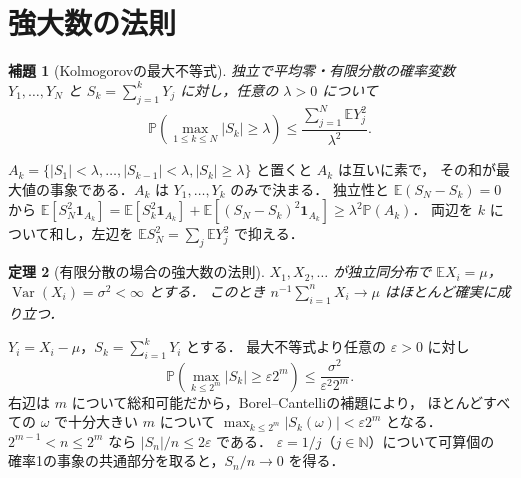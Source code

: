 \documentclass[a5paper,10pt,onecolumn]{jsarticle}
\makeatletter
\theoremstyle{mathnotetheorem}
\newtheorem{theorem}{定理}[section]
\newtheorem{lemma}[theorem]{補題}
\renewcommand{\proofname}{証明}
\renewenvironment{proof}[1][\proofname]{%
  \par\pushQED{\qed}\normalfont\topsep4\p@\@plus2\p@\relax
  \trivlist\item[\hskip\labelsep\bfseries #1]\ignorespaces
}{\popQED\endtrivlist\@endpefalse}
\makeatother
\begin{document}
\section{強大数の法則}
\begin{lemma}[Kolmogorovの最大不等式]
独立で平均零・有限分散の確率変数 $Y_1,\ldots,Y_N$ と
$S_k=\sum_{j=1}^kY_j$ に対し，任意の $\lambda>0$ について
\[
 \mathbb P\left(\max_{1\le k\le N}|S_k|\ge\lambda\right)
 \le\frac{\sum_{j=1}^N\mathbb E Y_j^2}{\lambda^2}.
\]
\end{lemma}
\begin{proof}
$A_k=\{|S_1|<\lambda,\ldots,|S_{k-1}|<\lambda,
|S_k|\ge\lambda\}$ と置くと $A_k$ は互いに素で，
その和が最大値の事象である．$A_k$ は $Y_1,\ldots,Y_k$ のみで決まる．
独立性と $\mathbb E(S_N-S_k)=0$ から
$\mathbb E[S_N^2\mathbf1_{A_k}]
=\mathbb E[S_k^2\mathbf1_{A_k}]
 +\mathbb E[(S_N-S_k)^2\mathbf1_{A_k}]
\ge\lambda^2\mathbb P(A_k)$．
両辺を $k$ について和し，左辺を
$\mathbb E S_N^2=\sum_j\mathbb E Y_j^2$ で抑える．
\end{proof}
\begin{theorem}[有限分散の場合の強大数の法則]
$X_1,X_2,\ldots$ が独立同分布で
$\mathbb E X_i=\mu$，$\operatorname{Var}(X_i)=\sigma^2<\infty$ とする．
このとき $n^{-1}\sum_{i=1}^nX_i\to\mu$ はほとんど確実に成り立つ．
\end{theorem}
\begin{proof}
$Y_i=X_i-\mu$，$S_k=\sum_{i=1}^kY_i$ とする．
最大不等式より任意の $\varepsilon>0$ に対し
\[
 \mathbb P\left(\max_{k\le2^m}|S_k|
 \ge\varepsilon2^m\right)
 \le\frac{\sigma^2}{\varepsilon^2 2^m}.
\]
右辺は $m$ について総和可能だから，Borel--Cantelliの補題により，
ほとんどすべての $\omega$ で十分大きい $m$ について
$\max_{k\le2^m}|S_k(\omega)|<\varepsilon2^m$ となる．
$2^{m-1}<n\le2^m$ なら $|S_n|/n\le2\varepsilon$ である．
$\varepsilon=1/j$（$j\in\mathbb N$）について可算個の
確率1の事象の共通部分を取ると，$S_n/n\to0$ を得る．
\end{proof}
\end{document}
